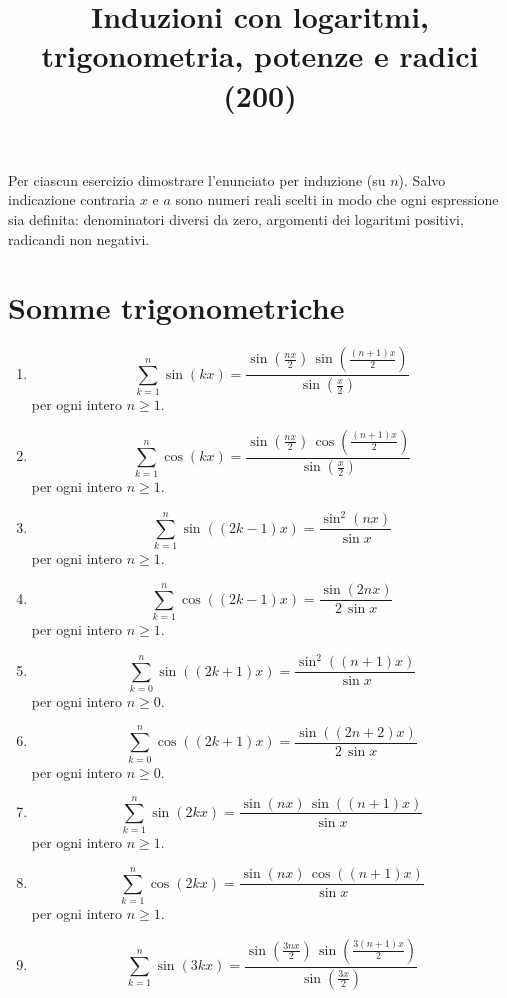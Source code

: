 \documentclass[11pt,a4paper]{article}
\title{Induzioni con logaritmi, trigonometria, potenze e radici (200)}
\author{}
\date{}
\begin{document}
\maketitle
Per ciascun esercizio dimostrare l'enunciato per induzione (su $n$). Salvo indicazione contraria $x$ e $a$ sono numeri reali scelti in modo che ogni espressione sia definita: denominatori diversi da zero, argomenti dei logaritmi positivi, radicandi non negativi.


\section*{Somme trigonometriche}
\begin{enumerate}
\setcounter{enumi}{0}
\item \[ \sum_{k=1}^{n} \sin\left(k x\right) = \frac{\sin\left(\frac{n x}{2}\right)\,\sin\left(\frac{\left(n + 1\right)x}{2}\right)}{\sin\left(\frac{x}{2}\right)} \]
{\small per ogni intero $n\ge 1$.}
\item \[ \sum_{k=1}^{n} \cos\left(k x\right) = \frac{\sin\left(\frac{n x}{2}\right)\,\cos\left(\frac{\left(n + 1\right)x}{2}\right)}{\sin\left(\frac{x}{2}\right)} \]
{\small per ogni intero $n\ge 1$.}
\item \[ \sum_{k=1}^{n} \sin\left(\left(2k - 1\right)x\right) = \frac{\sin^{2}\left(n x\right)}{\sin x} \]
{\small per ogni intero $n\ge 1$.}
\item \[ \sum_{k=1}^{n} \cos\left(\left(2k - 1\right)x\right) = \frac{\sin\left(2n x\right)}{2\,\sin x} \]
{\small per ogni intero $n\ge 1$.}
\item \[ \sum_{k=0}^{n} \sin\left(\left(2k + 1\right)x\right) = \frac{\sin^{2}\left(\left(n + 1\right)x\right)}{\sin x} \]
{\small per ogni intero $n\ge 0$.}
\item \[ \sum_{k=0}^{n} \cos\left(\left(2k + 1\right)x\right) = \frac{\sin\left(\left(2n + 2\right)x\right)}{2\,\sin x} \]
{\small per ogni intero $n\ge 0$.}
\item \[ \sum_{k=1}^{n} \sin\left(2k x\right) = \frac{\sin\left(n x\right)\,\sin\left(\left(n + 1\right)x\right)}{\sin x} \]
{\small per ogni intero $n\ge 1$.}
\item \[ \sum_{k=1}^{n} \cos\left(2k x\right) = \frac{\sin\left(n x\right)\,\cos\left(\left(n + 1\right)x\right)}{\sin x} \]
{\small per ogni intero $n\ge 1$.}
\item \[ \sum_{k=1}^{n} \sin\left(3k x\right) = \frac{\sin\left(\frac{3n x}{2}\right)\,\sin\left(\frac{3\left(n + 1\right)x}{2}\right)}{\sin\left(\frac{3x}{2}\right)} \]

\end{enumerate}
\end{document}
